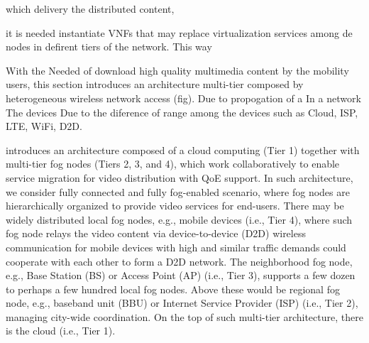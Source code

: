 which delivery the distributed content,

it is needed instantiate VNFs that may replace virtualization services among de nodes in defirent tiers of the network. This way 

With the Needed of download high quality multimedia content by the mobility users, this section introduces an architecture multi-tier composed by heterogeneous wireless network access (fig). Due to propogation of a In a network The devices  Due to the diference of range among the devices such as Cloud, ISP, LTE, WiFi, D2D. 

introduces an architecture composed of a cloud computing (Tier 1) together with multi-tier fog nodes (Tiers 2, 3, and 4), which work collaboratively to enable service migration for video distribution with QoE support. In such architecture, we consider fully connected and fully fog-enabled scenario, where fog nodes are hierarchically organized to provide video services for end-users. There may be widely distributed local fog nodes, e.g., mobile devices (i.e., Tier 4), where such fog node relays the video content via device-to-device (D2D) wireless communication for mobile devices with high and similar traffic demands could cooperate with each other to form a D2D network. The neighborhood fog node, e.g., Base Station (BS) or Access Point (AP) (i.e., Tier 3), supports a few dozen to perhaps a few hundred local fog nodes. Above these would be regional fog node, e.g., baseband unit (BBU) or Internet Service Provider (ISP) (i.e., Tier 2), managing city-wide coordination. On the top of such multi-tier architecture, there is the cloud (i.e., Tier 1). 
